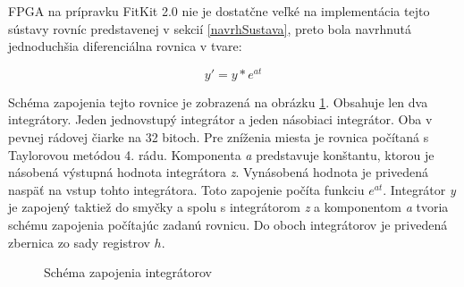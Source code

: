 

FPGA na prípravku FitKit 2.0 nie je dostatčne veľké na implementácia tejto  sústavy rovníc predstavenej v sekcií \ref{navrhSustava}, preto bola navrhnutá jednoduchšia diferenciálna rovnica v tvare:

\begin{equation}
y' = y * e^{at}
\end{equation}
\bigskip

Schéma zapojenia tejto rovnice je zobrazená na obrázku \ref{ppi_fp_sustava_impl}. Obsahuje len dva integrátory. Jeden jednovstupý integrátor a jeden násobiaci integrátor. Oba v pevnej rádovej čiarke na 32 bitoch. Pre zníženia miesta je rovnica počítaná s Taylorovou metódou 4. rádu. Komponenta \textit{a} predstavuje konštantu, ktorou je násobená výstupná hodnota integrátora \textit{z}. Vynásobená hodnota je privedená naspäť na vstup tohto integrátora. Toto zapojenie počíta funkciu $ e^{at} $. Integrátor \textit{y} je zapojený taktiež do smyčky a spolu s integrátorom \textit{z} a komponentom \textit{a} tvoria schému zapojenia počítajúc zadanú rovnicu. Do oboch integrátorov je privedená zbernica zo sady registrov $ h $.

\bigskip
\begin{figure}[h]
\centering
{}
\caption{Schéma zapojenia integrátorov}
\label{ppi_fp_sustava_impl}
\end{figure}


